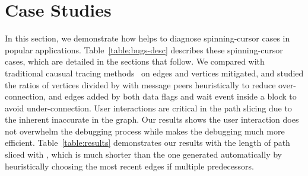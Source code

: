 \section{Case Studies}\label{sec:casestudy}

In this section, we demonstrate how \xxx helps to diagnose \nbug spinning-cursor
cases in \napps popular applications. Table~\ref{table:bugs-desc} describes
these spinning-cursor cases, which are detailed in the sections that follow.
We compared \xxx with traditional causual tracing methods~\cite{XXXX} on edges
and vertices \xxx mitigated, and studied the ratios of vertices divided by
with message peers heuristically to reduce over-connection, and edges added
by both data flags and wait event inside a block to avoid under-connection.
User interactions are critical in the path slicing due to the inherent
inaccurate in the graph. Our results shows the user interaction does not
overwhelm the debugging process while makes the debugging much more efficient.
Table~\ref{table:results} demonstrates our results with the length of path
sliced with \xxx, which is much shorter than the one generated automatically by
heuristically choosing the most recent edges if multiple predecessors.









